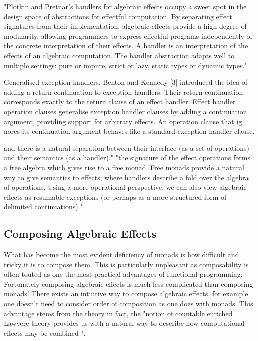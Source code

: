 "Plotkin and Pretnar’s handlers for algebraic effects occupy a sweet spot
in the design space of abstractions for effectful computation.
By separating effect signatures from their implementation,
algebraic effects provide a high degree of modularity,
allowing programmers to express effectful programs
independently of the concrete interpretation of their effects.
A handler is an interpretation of the effects of an algebraic computation.
The handler abstraction adapts well to multiple settings:
pure or impure, strict or lazy, static types or dynamic types."
\cite{kammar2013handlers}

Generalised exception handlers.
Benton and Kennedy [3] introduced the idea of adding
a return continuation to exception handlers.
Their return continuation corresponds exactly to the return clause of an effect handler.
Effect handler operation clauses generalise exception handler clauses by adding a continuation argument,
providing support for arbitrary effects.
An operation clause that ig nores its continuation argument
behaves like a standard exception handler clause.
\cite{kammar2013handlers}

and there is a natural separation between
their interface (as a set of operations)
and
their semantics (as a handler)."
"the signature of the effect operations forms a free algebra which gives rise to a free monad.
Free monads provide a natural way to give semantics to effects,
where handlers describe a fold over the algebra of operations.
Using a more operational perspective,
we can also view algebraic effects as resumable exceptions
(or perhaps as a more structured form of delimited continuations)."
\cite{leijen2017type}

\subsection{Composing Algebraic Effects}
What has become the most evident deficiency of monads is
how difficult and tricky it is to compose them.
This is particularly unpleasant as
composability is often touted as one the most practical advantages of functional programming.
Fortunately composing algebraic effects is much less complicated than composing monads!
There exists an intuitive way to compose algebraic effects,
for example one doesn't need to consider order of composition as one does with monads.
This advantage stems from the theory in fact,
the "notion of countable enriched Lawvere theory
provides us with a natural way to describe
how computational effects may be combined
"\cite{plotkin2004computational}.

